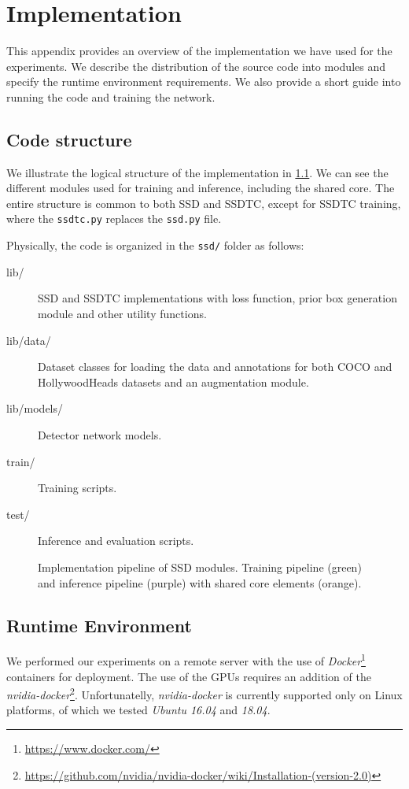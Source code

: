 \chapter{Implementation}
\label{app:impl}

This appendix provides an overview of the implementation we have used for the experiments. We describe the distribution of the source code into modules and specify the runtime environment requirements. We also provide a short guide into running the code and training the network.

\section{Code structure}
We illustrate the logical structure of the implementation in \cref{fig:logcode}. We can see the different modules used for training and inference, including the shared core. The entire structure is common to both SSD and SSDTC, except for SSDTC training, where the {\tt ssdtc.py} replaces the {\tt ssd.py} file.

Physically, the code is organized in the {\tt ssd/} folder as follows:
\begin{description}
\item[lib/] SSD and SSDTC implementations with loss function, prior box generation module and other utility functions.
\item[lib/data/] Dataset classes for loading the data and annotations for both COCO and HollywoodHeads datasets and an augmentation module.
\item[lib/models/] Detector network models.
\item[train/] Training scripts.
\item[test/] Inference and evaluation scripts.
\end{description}

\begin{figure}
    \centering
    \modules
    \caption[Implementation pipeline of SSD modules]{Implementation pipeline of SSD modules. Training pipeline (green) and inference pipeline (purple) with shared core elements (orange).}
    \label{fig:logcode}
\end{figure}


\section{Runtime Environment}
We performed our experiments on a remote server with the use of \textit{Docker}\footnote{\url{https://www.docker.com/}} containers for deployment. The use of the GPUs requires an addition of the \textit{nvidia-docker}\footnote{\url{https://github.com/nvidia/nvidia-docker/wiki/Installation-(version-2.0)}}. Unfortunatelly, \textit{nvidia-docker} is currently supported only on Linux platforms, of which we tested \textit{Ubuntu 16.04} and \textit{18.04}.

